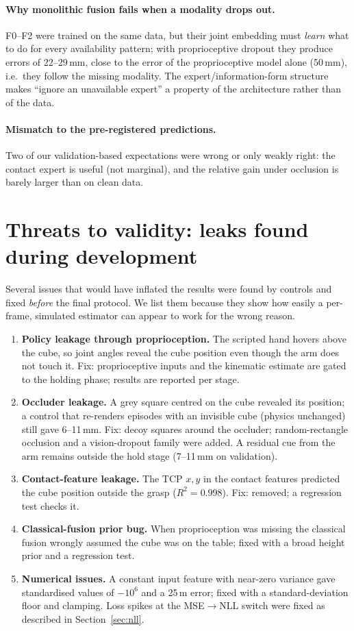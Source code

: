 \documentclass[11pt,a4paper]{article}
\begin{document}
\paragraph{Why monolithic fusion fails when a modality drops out.}
F0--F2 were trained on the same data, but their joint embedding must \emph{learn} what to do for every availability pattern; with proprioceptive dropout they produce errors of 22--29\,mm, close to the error of the proprioceptive model alone (50\,mm), i.e.\ they follow the missing modality. The expert/information-form structure makes ``ignore an unavailable expert'' a property of the architecture rather than of the data.

\paragraph{Mismatch to the pre-registered predictions.}
Two of our validation-based expectations were wrong or only weakly right: the contact expert is useful (not marginal), and the relative gain under occlusion is barely larger than on clean data.

\section{Threats to validity: leaks found during development}
\label{sec:leaks}
Several issues that would have inflated the results were found by controls and fixed \emph{before} the final protocol. We list them because they show how easily a per-frame, simulated estimator can appear to work for the wrong reason.
\begin{enumerate}
\item \textbf{Policy leakage through proprioception.} The scripted hand hovers above the cube, so joint angles reveal the cube position even though the arm does not touch it. Fix: proprioceptive inputs and the kinematic estimate are gated to the holding phase; results are reported per stage.
\item \textbf{Occluder leakage.} A grey square centred on the cube revealed its position; a control that re-renders episodes with an invisible cube (physics unchanged) still gave 6--11\,mm. Fix: decoy squares around the occluder; random-rectangle occlusion and a vision-dropout family were added. A residual cue from the arm remains outside the hold stage (7--11\,mm on validation).
\item \textbf{Contact-feature leakage.} The TCP $x,y$ in the contact features predicted the cube position outside the grasp ($R^2=0.998$). Fix: removed; a regression test checks it.
\item \textbf{Classical-fusion prior bug.} When proprioception was missing the classical fusion wrongly assumed the cube was on the table; fixed with a broad height prior and a regression test.
\item \textbf{Numerical issues.} A constant input feature with near-zero variance gave standardised values of $-10^{6}$ and a 25\,m error; fixed with a standard-deviation floor and clamping. Loss spikes at the MSE$\to$NLL switch were fixed as described in Section~\ref{sec:nll}.
\end{enumerate}
\end{document}
